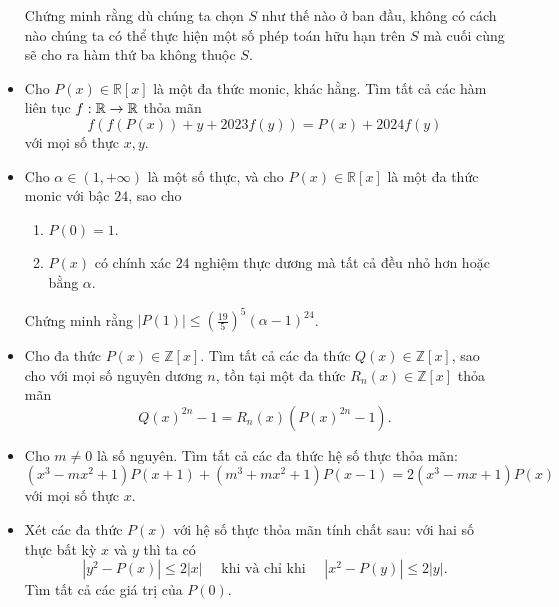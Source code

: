 \documentclass[11pt]{scrartcl}
\begin{document}
\begin{itemize}[label=, leftmargin=0em, itemsep=0.5em]
\begin{btvn}
            Chứng minh rằng dù chúng ta chọn $S$ như thế nào ở ban đầu, không có cách nào chúng ta có thể thực hiện một số phép toán hữu hạn trên $S$ mà cuối cùng sẽ cho ra hàm thứ ba không thuộc $S$.
        \end{btvn}
        \item \begin{btvn}
            Cho $P(x) \in \mathbb{R}[x]$ là một đa thức monic, khác hằng. Tìm tất cả các hàm liên tục $f: \mathbb{R} \to \mathbb{R}$ thỏa mãn
            $$f(f(P(x))+y+2023f(y))=P(x)+2024f(y)$$
            với mọi số thực $x,y$.
        \end{btvn}
        \item \begin{btvn}
            Cho $\alpha \in (1, +\infty)$ là một số thực, và cho $P(x) \in \mathbb{R}[x]$ là một đa thức monic với bậc $24$, sao cho
            \begin{enumerate}
                \item $P(0) = 1$.
                \item $P(x)$ có chính xác $24$ nghiệm thực dương mà tất cả đều nhỏ hơn hoặc bằng $\alpha$.
            \end{enumerate}
            Chứng minh rằng $|P(1)| \le \left( \frac{19}{5}\right)^5 (\alpha-1)^{24}$.
        \end{btvn}
        \item \begin{btvn}
           Cho đa thức $P(x) \in \mathbb{Z}[x]$. Tìm tất cả các đa thức $Q(x) \in \mathbb{Z}[x]$, sao cho với mọi số nguyên dương $n$, tồn tại một đa thức $R_n(x) \in \mathbb{Z}[x]$ thỏa mãn
            $$Q(x)^{2n} - 1 = R_n(x)\left(P(x)^{2n} - 1\right).$$
        \end{btvn}
        \item \begin{btvn} Cho $m \neq 0$ là số nguyên. Tìm tất cả các đa thức hệ số thực thỏa mãn:
        \[
            (x^3 - mx^2 + 1)P(x + 1) + (m^3 + mx^2 + 1)P(x - 1) = 2(x^3 - mx + 1)P(x)
        \]
        với mọi số thực $x$.
        \end{btvn}
        \item \begin{btvn} Xét các đa thức $P(x)$ với hệ số thực thỏa mãn tính chất sau: với hai số thực bất kỳ $x$ và $y$ thì ta có \[|y^2-P(x)|\le 2|x|\quad\text{ khi và chỉ khi }\quad |x^2-P(y)|\le 2|y|.\]Tìm tất cả các giá trị của $P(0)$.

\end{btvn}
\end{itemize}
\end{document}
